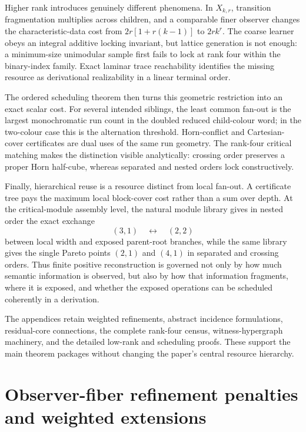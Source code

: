 \documentclass[11pt]{article}
\begin{document}
Higher rank introduces genuinely different phenomena.  In $X_{k,r}$,
transition fragmentation multiplies across children, and a comparable finer
observer changes the characteristic-data cost from
$2r[1+r(k-1)]$ to $2rk^r$.  The coarse learner obeys an integral additive
locking invariant, but lattice generation is not enough: a minimum-size
unimodular sample first fails to lock at rank four within the binary-index family.  Exact laminar
trace reachability identifies the missing resource as derivational
realizability in a linear terminal order.

The ordered scheduling theorem then turns this geometric restriction into an
exact scalar cost.  For several intended siblings, the least common fan-out is
the largest monochromatic run count in the doubled reduced child-colour word;
in the two-colour case this is the alternation threshold.  Horn-conflict and
Cartesian-cover certificates are dual uses of the same run geometry.  The
rank-four critical matching makes the distinction visible analytically:
crossing order preserves a proper Horn half-cube, whereas separated and nested
orders lock constructively.

Finally, hierarchical reuse is a resource distinct from local fan-out.  A
certificate tree pays the maximum local block-cover cost rather than a sum over
depth.  At the critical-module assembly level, the natural module library gives
in nested order the exact exchange
\[
  (3,1)\quad\longleftrightarrow\quad(2,2)
\]
between local width and exposed parent-root branches, while the same library
gives the single Pareto points $(2,1)$ and $(4,1)$ in separated and crossing
orders.  Thus finite positive
reconstruction is governed not only by how much semantic information is
observed, but also by how that information fragments, where it is exposed, and
whether the exposed operations can be scheduled coherently in a derivation.

The appendices retain weighted refinements, abstract incidence formulations,
residual-core connections, the complete rank-four census, witness-hypergraph
machinery, and the detailed low-rank and scheduling proofs.  These support the
main theorem packages without changing the paper's central resource hierarchy.

\appendix

\section{Observer-fiber refinement penalties and weighted extensions}
\label{app:weighted-rectangular}
\end{document}
